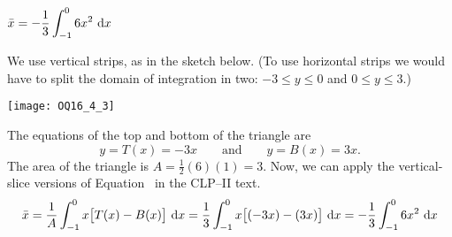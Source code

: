 \begin{answer}
$\displaystyle\bar x = -\frac{1}{3} \int_{-1}^0 6x^2\ \mathrm{d}x$
\end{answer}

\begin{solution}
We use vertical strips, as in the sketch below. (To use horizontal strips
we would have to split the domain of integration in two: $-3\le y\le 0$
and $0\le y\le 3$.)

\begin{center}
   \texttt{[image: OQ16\_4\_3]}
\end{center}

\noindent
The equations of the top and bottom of the triangle are
\begin{equation*}
y = T(x) = -3x \qquad\text{and}\qquad
y = B(x) = 3x.
\end{equation*}
The area of the triangle is $A=\frac12(6)(1)=3$.
Now, we can apply the vertical-slice versions of Equation~
 in the CLP--II text.
\begin{equation*}
\bar x = \frac{1}{A}\int_{-1}^0 x \big[T(x)- B(x)\big]\ \mathrm{d}x
= \frac{1}{3} \int_{-1}^0 x \big[({-}3x)-(3x)\big]\ \mathrm{d}x
= -\frac{1}{3} \int_{-1}^0 6x^2\ \mathrm{d}x
\end{equation*}

\end{solution}





\subsection*{\Procedural}



